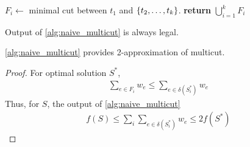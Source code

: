 \begin{algorithm}
	\caption{}\label{alg:naive_multicut}
	\begin{algorithmic}[1]
		\State $F_i \gets$ minimal cut between $t_1$ and $\qty{t_2,\dots, t_k}$.
		\EndFor
		\State \textbf{return} $\bigcup_{i=1}^k F_i$
		\EndProcedure
	\end{algorithmic}
\end{algorithm}

\begin{lemma}
	Output of \vref{alg:naive_multicut} is always legal.
\end{lemma}
\begin{lemma}
\vref{alg:naive_multicut} provides 2-approximation of multicut.
\begin{proof}
	For optimal solution $S^*$,
	\begin{align}
	\sum_{e\in F_i} w_e \leqslant \sum_{e\in \delta(S^*_i)} w_e
	\end{align}
	Thus, for $S$, the output of \vref{alg:naive_multicut} 
	\begin{align}
	f(S)  \leqslant \sum_i \sum_{e\in \delta(S^*_i)} w_e \leqslant 2f(S^*)
	\end{align}
\end{proof}
\end{lemma}

